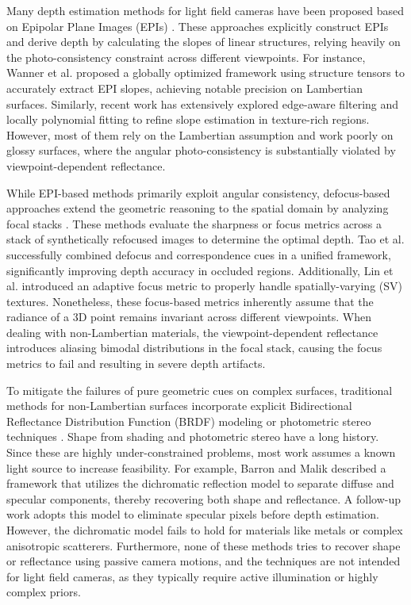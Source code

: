 \documentclass[lettersize,journal]{IEEEtran}
\begin{document}
Many depth estimation methods for light field cameras have been proposed based on Epipolar Plane Images (EPIs) \cite{epipolarepipo}. These approaches explicitly construct EPIs and derive depth by calculating the slopes of linear structures, relying heavily on the photo-consistency constraint across different viewpoints. For instance, Wanner et al. \cite{wannerwanne} proposed a globally optimized framework using structure tensors to accurately extract EPI slopes, achieving notable precision on Lambertian surfaces. Similarly, recent work \cite{epiepi_11} has extensively explored edge-aware filtering and locally polynomial fitting to refine slope estimation in texture-rich regions. However, most of them rely on the Lambertian assumption and work poorly on glossy surfaces, where the angular photo-consistency is substantially violated by viewpoint-dependent reflectance.

While EPI-based methods primarily exploit angular consistency, defocus-based approaches extend the geometric reasoning to the spatial domain by analyzing focal stacks \cite{focalfocal}. These methods evaluate the sharpness or focus metrics across a stack of synthetically refocused images to determine the optimal depth. Tao et al. \cite{taotao} successfully combined defocus and correspondence cues in a unified framework, significantly improving depth accuracy in occluded regions. Additionally, Lin et al. \cite{epiepi} introduced an adaptive focus metric to properly handle spatially-varying (SV) textures. Nonetheless, these focus-based metrics inherently assume that the radiance of a 3D point remains invariant across different viewpoints. When dealing with non-Lambertian materials, the viewpoint-dependent reflectance introduces aliasing bimodal distributions in the focal stack, causing the focus metrics to fail and resulting in severe depth artifacts.

To mitigate the failures of pure geometric cues on complex surfaces, traditional methods for non-Lambertian surfaces incorporate explicit Bidirectional Reflectance Distribution Function (BRDF) modeling or photometric stereo techniques \cite{brdfbrdf}. Shape from shading and photometric stereo have a long history. Since these are highly under-constrained problems, most work assumes a known light source to increase feasibility. For example, Barron and Malik \cite{barronbarro} described a framework that utilizes the dichromatic reflection model to separate diffuse and specular components, thereby recovering both shape and reflectance. A follow-up work \cite{dichromati} adopts this model to eliminate specular pixels before depth estimation. However, the dichromatic model fails to hold for materials like metals or complex anisotropic scatterers. Furthermore, none of these methods tries to recover shape or reflectance using passive camera motions, and the techniques are not intended for light field cameras, as they typically require active illumination or highly complex priors.
\end{document}
